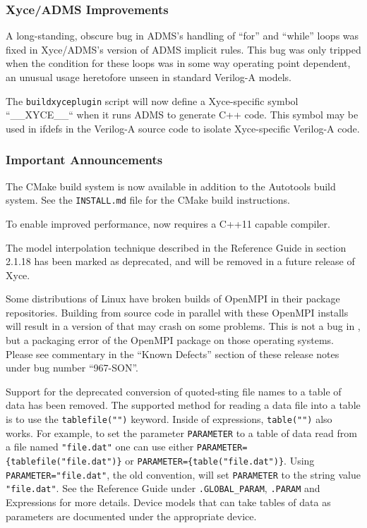 \documentclass[letterpaper]{scrartcl}
\begin{document}
\subsubsection*{Xyce/ADMS Improvements}
\begin{XyceItemize}
  \item A long-standing, obscure bug in ADMS's handling of ``for'' and
    ``while'' loops was fixed in Xyce/ADMS's version of ADMS implicit
    rules.  This bug was only tripped when the condition for these
    loops was in some way operating point dependent, an unusual usage
    heretofore unseen in standard Verilog-A models.
  \item The \texttt{buildxyceplugin} script will now define a
    Xyce-specific symbol ``\_\_XYCE\_\_`` when it runs ADMS to
    generate C++ code.  This symbol may be used in ifdefs in the
    Verilog-A source code to isolate Xyce-specific Verilog-A code.
\end{XyceItemize}

\subsubsection*{Important Announcements}
\begin{XyceItemize}
\item The CMake build system is now available in addition to the Autotools
     build system. See the \texttt{INSTALL.md} file for the CMake build
     instructions.
\item To enable improved performance, \Xyce{} now requires a C++11
  capable compiler.
\item The model interpolation technique described in the \Xyce{}
  Reference Guide in section 2.1.18 has been marked as deprecated, and
  will be removed in a future release of Xyce.
\item Some distributions of Linux have
  broken builds of OpenMPI in their package repositories.  Building
  \Xyce{} from source code in parallel with these OpenMPI installs
  will result in a version of \Xyce{} that may crash on some problems.
  This is not a bug in \Xyce{}, but a packaging error of the OpenMPI
  package on those operating systems.  Please see commentary in the
  ``Known Defects'' section of these release notes under bug number
  ``967-SON''.
 \item Support for the deprecated conversion of quoted-sting file
   names to a table of data has been removed.  The supported method
   for reading a data file into a table is to use the
   \texttt{tablefile("")} keyword.  Inside of expressions,
   \texttt{table("")} also works.  For example, to set the parameter
   \texttt{PARAMETER} to a table of data read from a file named
   \texttt{"file.dat"} one can use either
   \texttt{PARAMETER=\{tablefile("file.dat")\}} or
   \texttt{PARAMETER=\{table("file.dat")\}}.  Using
   \texttt{PARAMETER="file.dat"}, the old convention, will set
   \texttt{PARAMETER} to the string value \texttt{"file.dat"}.  See
   the \Xyce{} Reference Guide under \texttt{.GLOBAL\_PARAM},
   \texttt{.PARAM} and Expressions for more details.  Device models
   that can take tables of data as parameters are documented under the
   appropriate device.
\end{XyceItemize}
\end{document}
